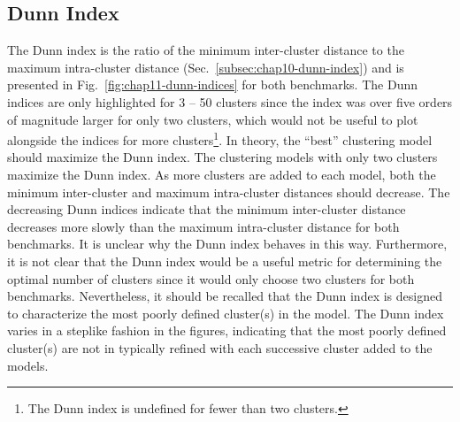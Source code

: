 \clearpage

\subsection{Dunn Index}
\label{subsec:chap11-dunn-index}

The Dunn index is the ratio of the minimum inter-cluster distance to the maximum intra-cluster distance (Sec.~\ref{subsec:chap10-dunn-index}) and is presented in Fig.~\ref{fig:chap11-dunn-indices} for both benchmarks. The Dunn indices are only highlighted for 3 -- 50 clusters since the index was over five orders of magnitude larger for only two clusters, which would not be useful to plot alongside the indices for more clusters\footnote{The Dunn index is undefined for fewer than two clusters.}. In theory, the ``best'' clustering model should maximize the Dunn index. The clustering models with only two clusters maximize the Dunn index. As more clusters are added to each model, both the minimum inter-cluster and maximum intra-cluster distances should decrease. The decreasing Dunn indices indicate that the minimum inter-cluster distance decreases more slowly than the maximum intra-cluster distance for both benchmarks. It is unclear why the Dunn index behaves in this way. Furthermore, it is not clear that the Dunn index would be a useful metric for determining the optimal number of clusters since it would only choose two clusters for both benchmarks. Nevertheless, it should be recalled that the Dunn index is designed to characterize the most poorly defined cluster(s) in the model. The Dunn index varies in a steplike fashion in the figures, indicating that the most poorly defined cluster(s) are not in typically refined with each successive cluster added to the models.

